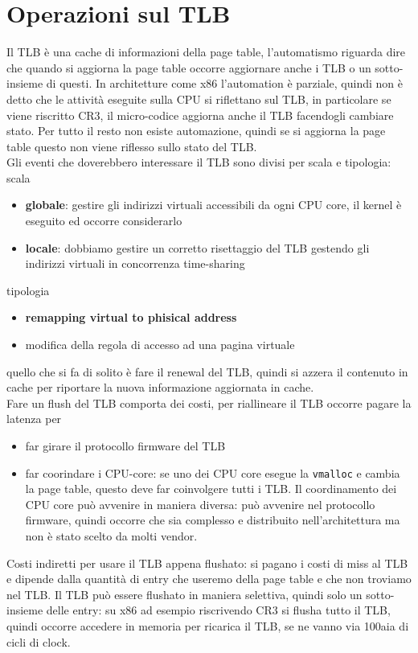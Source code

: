 \documentclass[12pt, oneside]{extbook}
\begin{document}
\section{Operazioni sul TLB}
Il TLB è una cache di informazioni della page table, l'automatismo riguarda dire che quando si aggiorna la page table occorre aggiornare anche i TLB o un sotto-insieme di questi. In architetture come x86 l'automation è parziale, quindi non è detto che le attività eseguite sulla CPU si riflettano sul TLB, in particolare se viene riscritto CR3, il micro-codice aggiorna anche il TLB facendogli cambiare stato. Per tutto il resto non esiste automazione, quindi se si aggiorna la page table questo non viene riflesso sullo stato del TLB.\\Gli eventi che doverebbero interessare il TLB sono divisi per scala e tipologia:
scala
\begin{itemize}
\item \textbf{globale}: gestire gli indirizzi virtuali accessibili da ogni CPU core, il kernel è eseguito ed occorre considerarlo
\item \textbf{locale}: dobbiamo gestire un corretto risettaggio del TLB gestendo gli indirizzi virtuali in concorrenza time-sharing
\end{itemize}
tipologia
\begin{itemize}
\item \textbf{remapping virtual to phisical address}
\item modifica della regola di accesso ad una pagina virtuale
\end{itemize}
quello che si fa di solito è fare il renewal del TLB, quindi si azzera il contenuto in cache per riportare la nuova informazione aggiornata in cache.\\ Fare un flush del TLB comporta dei costi, per riallineare il TLB occorre pagare la latenza per
\begin{itemize}
\item far girare il protocollo firmware del TLB
\item far coorindare i CPU-core: se uno dei CPU core esegue la \texttt{vmalloc} e cambia la page table, questo deve far coinvolgere tutti i TLB. Il coordinamento dei CPU core può avvenire in maniera diversa: può avvenire nel protocollo firmware, quindi occorre che sia complesso e distribuito nell'architettura ma non è stato scelto da molti vendor.
\end{itemize}
Costi indiretti per usare il TLB appena flushato: si pagano i costi di miss al TLB e dipende dalla quantità di entry che useremo della page table e che non troviamo nel TLB. Il TLB può essere flushato in maniera selettiva, quindi solo un sotto-insieme delle entry: su x86 ad esempio riscrivendo CR3 si flusha tutto il TLB, quindi occorre accedere in memoria per ricarica il TLB, se ne vanno via 100aia di cicli di clock.
\end{document}
